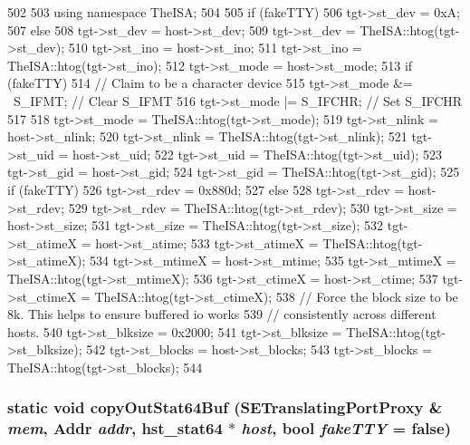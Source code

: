\begin{DoxyCode}
502 {
503     using namespace TheISA;
504 
505     if (fakeTTY)
506         tgt->st_dev = 0xA;
507     else
508         tgt->st_dev = host->st_dev;
509     tgt->st_dev = TheISA::htog(tgt->st_dev);
510     tgt->st_ino = host->st_ino;
511     tgt->st_ino = TheISA::htog(tgt->st_ino);
512     tgt->st_mode = host->st_mode;
513     if (fakeTTY) {
514         // Claim to be a character device
515         tgt->st_mode &= ~S_IFMT;    // Clear S_IFMT
516         tgt->st_mode |= S_IFCHR;    // Set S_IFCHR
517     }
518     tgt->st_mode = TheISA::htog(tgt->st_mode);
519     tgt->st_nlink = host->st_nlink;
520     tgt->st_nlink = TheISA::htog(tgt->st_nlink);
521     tgt->st_uid = host->st_uid;
522     tgt->st_uid = TheISA::htog(tgt->st_uid);
523     tgt->st_gid = host->st_gid;
524     tgt->st_gid = TheISA::htog(tgt->st_gid);
525     if (fakeTTY)
526         tgt->st_rdev = 0x880d;
527     else
528         tgt->st_rdev = host->st_rdev;
529     tgt->st_rdev = TheISA::htog(tgt->st_rdev);
530     tgt->st_size = host->st_size;
531     tgt->st_size = TheISA::htog(tgt->st_size);
532     tgt->st_atimeX = host->st_atime;
533     tgt->st_atimeX = TheISA::htog(tgt->st_atimeX);
534     tgt->st_mtimeX = host->st_mtime;
535     tgt->st_mtimeX = TheISA::htog(tgt->st_mtimeX);
536     tgt->st_ctimeX = host->st_ctime;
537     tgt->st_ctimeX = TheISA::htog(tgt->st_ctimeX);
538     // Force the block size to be 8k. This helps to ensure buffered io works
539     // consistently across different hosts.
540     tgt->st_blksize = 0x2000;
541     tgt->st_blksize = TheISA::htog(tgt->st_blksize);
542     tgt->st_blocks = host->st_blocks;
543     tgt->st_blocks = TheISA::htog(tgt->st_blocks);
544 }
\end{DoxyCode}
\hypertarget{syscall__emul_8hh_a19c436e0b01699972a23c7d7abba0f05}{
\subsubsection[{copyOutStat64Buf}]{\setlength{\rightskip}{0pt plus 5cm}static void copyOutStat64Buf ({\bf SETranslatingPortProxy} \& {\em mem}, \/  {\bf Addr} {\em addr}, \/  {\bf hst\_\-stat64} $\ast$ {\em host}, \/  bool {\em fakeTTY} = {\ttfamily false})}}
\label{syscall__emul_8hh_a19c436e0b01699972a23c7d7abba0f05}



